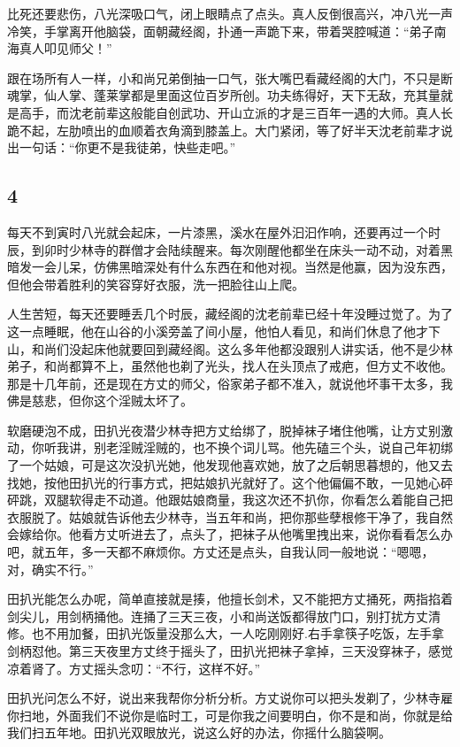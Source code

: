 比死还要悲伤，八光深吸口气，闭上眼睛点了点头。真人反倒很高兴，冲八光一声冷笑，手掌离开他脑袋，面朝藏经阁，扑通一声跪下来，带着哭腔喊道：“弟子南海真人叩见师父！”

跟在场所有人一样，小和尚兄弟倒抽一口气，张大嘴巴看藏经阁的大门，不只是断魂掌，仙人掌、蓬莱掌都是里面这位百岁所创。功夫练得好，天下无敌，充其量就是高手，而沈老前辈这般能自创武功、开山立派的才是三百年一遇的大师。真人长跪不起，左肋喷出的血顺着衣角滴到膝盖上。大门紧闭，等了好半天沈老前辈才说出一句话：“你更不是我徒弟，快些走吧。”
\newline

{\centering\subsection{4}}

每天不到寅时八光就会起床，一片漆黑，溪水在屋外汩汩作响，还要再过一个时辰，到卯时少林寺的群僧才会陆续醒来。每次刚醒他都坐在床头一动不动，对着黑暗发一会儿呆，仿佛黑暗深处有什么东西在和他对视。当然是他赢，因为没东西，但他会带着胜利的笑容穿好衣服，洗一把脸往山上爬。

人生苦短，每天还要睡丢几个时辰，藏经阁的沈老前辈已经十年没睡过觉了。为了这一点睡眠，他在山谷的小溪旁盖了间小屋，他怕人看见，和尚们休息了他才下山，和尚们没起床他就要回到藏经阁。这么多年他都没跟别人讲实话，他不是少林弟子，和尚都算不上，虽然他也剃了光头，找人在头顶点了戒疤，但方丈不收他。那是十几年前，还是现在方丈的师父，俗家弟子都不准入，就说他坏事干太多，我佛是慈悲，但你这个淫贼太坏了。

软磨硬泡不成，田扒光夜潜少林寺把方丈给绑了，脱掉袜子堵住他嘴，让方丈别激动，你听我讲，别老淫贼淫贼的，也不换个词儿骂。他先磕三个头，说自己年初绑了一个姑娘，可是这次没扒光她，他发现他喜欢她，放了之后朝思暮想的，他又去找她，按他田扒光的行事方式，把姑娘扒光就好了。这个他偏偏不敢，一见她心砰砰跳，双腿软得走不动道。他跟姑娘商量，我这次还不扒你，你看怎么着能自己把衣服脱了。姑娘就告诉他去少林寺，当五年和尚，把你那些孽根修干净了，我自然会嫁给你。他看方丈听进去了，点头了，把袜子从他嘴里拽出来，说你看看怎么办吧，就五年，多一天都不麻烦你。方丈还是点头，自我认同一般地说：“嗯嗯，对，确实不行。”

田扒光能怎么办呢，简单直接就是揍，他擅长剑术，又不能把方丈捅死，两指掐着剑尖儿，用剑柄捅他。连捅了三天三夜，小和尚送饭都得放门口，别打扰方丈清修。也不用加餐，田扒光饭量没那么大，一人吃刚刚好.右手拿筷子吃饭，左手拿剑柄怼他。第三天夜里方丈终于摇头了，田扒光把袜子拿掉，三天没穿袜子，感觉凉着肾了。方丈摇头念叨：“不行，这样不好。”

田扒光问怎么不好，说出来我帮你分析分析。方丈说你可以把头发剃了，少林寺雇你扫地，外面我们不说你是临时工，可是你我之间要明白，你不是和尚，你就是给我们扫五年地。田扒光双眼放光，说这么好的办法，你摇什么脑袋啊。

